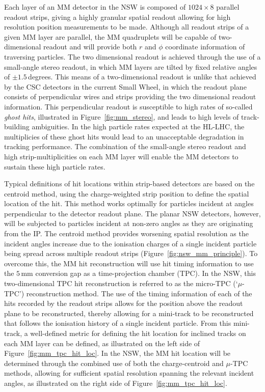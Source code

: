 Each layer of an MM detector in the NSW is composed of $1024 \times 8$ parallel readout strips, giving
a highly granular spatial readout allowing for high resolution position measurements to be made.
Although all readout strips of a given MM layer are parallel, the MM quadruplets will be capable
of two-dimensional readout and will provide both $r$ and $\phi$ coordinate information
of traversing particles.
The two dimensional readout is achieved through the use of a small-angle stereo readout, in which
MM layers are tilted by fixed relative angles of $\pm 1.5$\,degrees.
This means of a two-dimensional readout is unlike that achieved by the CSC detectors in the current
Small Wheel, in which the readout plane consists of perpendicular wires and strips providing
the two dimensional readout information.
This perpendicular readout is susceptible to high rates of so-called \textit{ghost hits},
illustrated in Figure~\ref{fig:mm_stereo}, and leads to high levels of track-building ambiguities.
In the high particle rates expected at the HL-LHC, the multiplicies of these ghost hits would
lead to an unacceptable degradation in tracking performance.
The combination of the small-angle stereo readout and high strip-multiplicities on each MM layer will
enable the MM detectors to sustain these high particle rates.

Typical definitions of hit locations within strip-based detectors are based on the
centroid method, using the charge-weighted strip position to define the spatial location
of the hit.
This method works optimally for particles incident at angles perpendicular to the detector readout plane.
The planar NSW detectors, however, will be subjected to particles incident at non-zero angles as they are
originating from the IP.
The centroid method provides worsening spatial resolution as the incident angles increase due
to the ionisation charges of a single incident particle being spread across multiple readout strips (Figure~\ref{fig:nsw_mm_principle}).
To overcome this, the MM hit reconstruction will use hit timing information
to use the $5$\,mm conversion gap as a time-projection chamber (TPC).
In the NSW, this two-dimensional TPC hit reconstruction is referred to as the micro-TPC (`$\mu$-TPC') reconstruction method.
The use of the timing information of each of the hits recorded by the readout strips
allows for the position above the readout plane to be reconstructed, thereby
allowing for a mini-track to be reconstructed that follows the ionisation history
of a single incident particle.
From this mini-track, a well-defined metric for defining the hit location for inclined tracks on
each MM layer can be defined, as illustrated on the left side of Figure~\ref{fig:mm_tpc_hit_loc}.
In the NSW, the MM hit location will be determined through the combined use of both the
charge-centroid and $\mu$-TPC methods, allowing for sufficient spatial resolution spanning the relevant
incident angles, as illustrated on the right side of Figure~\ref{fig:mm_tpc_hit_loc}.


